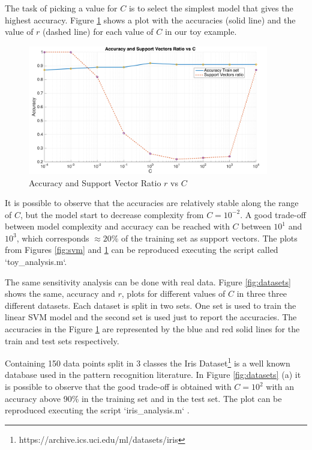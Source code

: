 The task of picking a value for $C$ is to select the simplest model that gives the highest accuracy.
Figure \ref{fig:toy} shows a plot with the accuracies (solid line) and the value of $r$ (dashed line) for each value of $C$ in our toy example.

\begin{figure}[!htb]
\begin{center}
\includegraphics [width=10.5cm] {./graphics/toy_plot.png}
\caption{Accuracy and Support Vector Ratio $r$ vs $C$} \label{fig:toy}
\end{center}
\end{figure}

It is possible to observe that the accuracies are relatively stable along the range of $C$, but the model start to decrease complexity from $C=10^{-2}$.
A good trade-off between model complexity and accuracy can be reached with $C$ between $10^1$ and $10^3$, which corresponds $\approx 20\%$ of the training set as support vectors. 
The plots from Figures \ref{fig:svm} and \ref{fig:toy} can be reproduced executing the script called `toy\_analysis.m`.

The same sensitivity analysis can be done with real data.
Figure \ref{fig:datasets} shows the same, accuracy and $r$, plots for different values of $C$ in three three different datasets.
Each dataset is split in two sets.
One set is used to train the linear SVM model and the second set is used just to report the accuracies.
The accuracies in the Figure \ref{fig:toy} are represented by the blue and red solid lines for the train and test sets respectively.

Containing 150 data points split in 3 classes the Iris Dataset\footnote{https://archive.ics.uci.edu/ml/datasets/iris} is a well known database used in the pattern recognition literature.
In Figure \ref{fig:datasets} (a) it is possible to observe that the good trade-off is obtained with $C=10^2$ with an accuracy above 90\% in the training set and in the test set.
The plot can be reproduced executing the script `iris\_analysis.m` .

